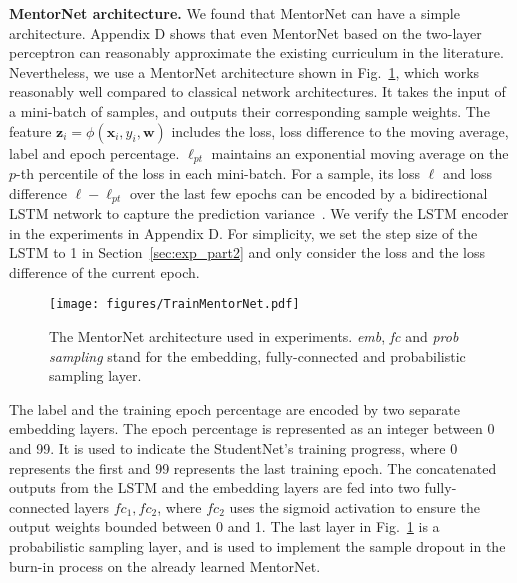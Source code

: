 \documentclass{article}
\begin{document}
\textbf{MentorNet architecture.} We found that MentorNet can have a simple architecture. Appendix D shows that even MentorNet based on the two-layer perceptron can reasonably approximate the existing curriculum in the literature. Nevertheless, we use a MentorNet architecture shown in Fig.~\ref{fig:mentornet_arch}, which works reasonably well compared to classical network architectures. It takes the input of a mini-batch of samples, and outputs their corresponding sample weights. The feature $\mathbf{z}_i = \phi(\mathbf{x}_i, y_i, \mathbf{w})$ includes the loss, loss difference to the moving average, label and epoch percentage. $\ell_{pt}$ maintains an exponential moving average on the $p$-th percentile of the loss in each mini-batch. For a sample, its loss $\ell$ and loss difference $\ell-\ell_{pt}$ over the last few epochs can be encoded by a bidirectional LSTM network to capture the prediction variance~\cite{chang2017active}. We verify the LSTM encoder in the experiments in Appendix D. For simplicity, we set the step size of the LSTM to 1 in Section~\ref{sec:exp_part2} and only consider the loss and the loss difference of the current epoch.

\begin{figure}[ht]
\vspace{-3mm}
\centering
\texttt{[image: figures/TrainMentorNet.pdf]}
\vspace{-5mm}
\caption{\label{fig:mentornet_arch}The MentorNet architecture used in experiments. \textit{emb}, \textit{fc} and \textit{prob sampling} stand for the embedding, fully-connected and probabilistic sampling layer.}
\vspace{-5mm}
\end{figure}

The label and the training epoch percentage are encoded by two separate embedding layers. The epoch percentage is represented as an integer between 0 and 99. It is used to indicate the StudentNet's training progress, where 0 represents the first and 99 represents the last training epoch. The concatenated outputs from the LSTM and the embedding layers are fed into two fully-connected layers $fc_1, fc_2$, where $fc_2$ uses the sigmoid activation to ensure the output weights bounded between 0 and 1. The last layer in Fig.~\ref{fig:mentornet_arch} is a probabilistic sampling layer, and is used to implement the sample dropout in the burn-in process on the already learned MentorNet. 

\vspace{-2mm}
\end{document}
